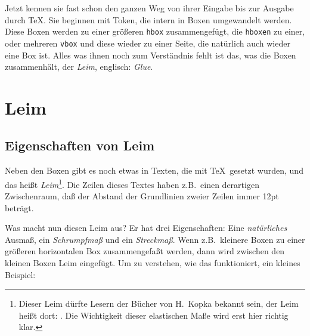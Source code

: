 Jetzt kennen sie fast schon den ganzen Weg von ihrer 
Eingabe bis zur 
Ausgabe durch \TeX. Sie beginnen mit Token, die intern in Boxen
umgewandelt werden. Diese Boxen werden zu einer gr\"o\ss{}eren {\tt hbox}
zusammengef\"ugt, die {\tt hboxen} zu einer, oder mehreren {\tt vbox}
und diese wieder zu einer 
Seite, die nat\"urlich auch wieder eine Box
ist. Alles was ihnen noch zum Verst\"andnis fehlt ist das, was die Boxen
zusammenh\"alt, der {\em Leim}, englisch: {\em Glue}.
\section{Leim}
\subsection{Eigenschaften von Leim}
Neben den Boxen gibt es noch etwas in Texten, die mit \TeX\ gesetzt
wurden, und das hei\ss{}t {\em Leim}\footnote{Dieser Leim d\"urfte Lesern
der B\"ucher von H.\ Kopka bekannt sein, der Leim hei\ss{}t dort:
. Die Wichtigkeit dieser elastischen Ma\ss{}e wird erst
hier richtig klar.}. Die Zeilen dieses Textes haben z.B.\ einen
derartigen Zwischenraum, da\ss{} der 
Abstand der Grundlinien zweier Zeilen
immer 12pt betr\"agt.

Was macht nun diesen Leim aus? Er hat drei Eigenschaften: Eine {\em
nat\"urliches} Ausma\ss{}, ein 
{\em Schrumpfma\ss{}} und ein {\em Streckma\ss{}}.
Wenn z.B.\ kleinere Boxen zu einer gr\"o\ss{}eren horizontalen Box
zusammengefa\ss{}t werden, dann wird zwischen den kleinen Boxen Leim
eingef\"ugt. Um zu verstehen, wie das funktioniert, ein kleines
Beispiel:

